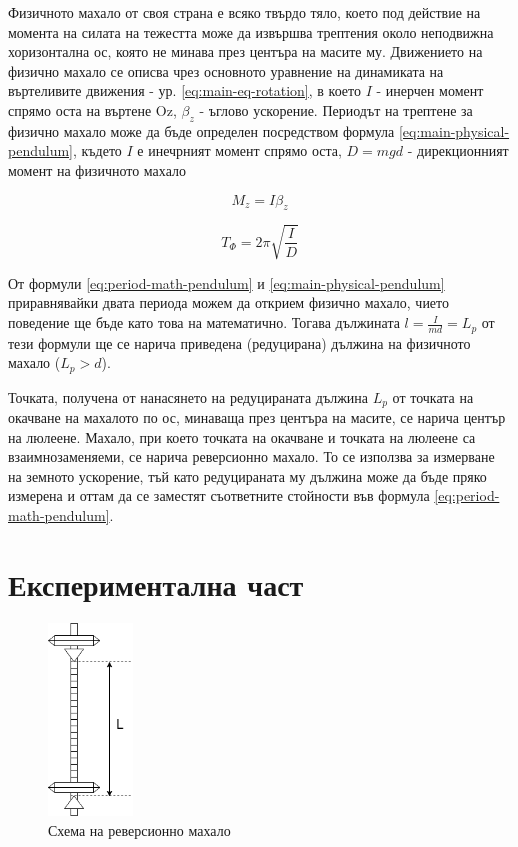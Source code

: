\documentclass[12pt]{article}
\begin{document}
Физичното махало от своя страна е всяко твърдо тяло, което под действие на момента на силата на тежестта може да извършва трептения около неподвижна хоризонтална ос, която не минава през центъра на масите му. Движението на физично махало се описва чрез основното уравнение на динамиката на въртеливите движения - ур. \ref{eq:main-eq-rotation}, в което $I$ - инерчен момент спрямо оста на въртене Oz, $\beta_z$ - ъглово ускорение. Периодът на трептене за физично махало може да бъде определен посредством формула \ref{eq:main-physical-pendulum}, където $I$ е инечрният момент спрямо оста, $D = mgd $ - дирекционният момент на физичното махало 

\begin{equation}\label{eq:main-eq-rotation}
    M_z = I\beta_z
\end{equation}

\begin{equation}\label{eq:main-physical-pendulum}
    T_\Phi = 2\pi \sqrt{\frac{I}{D}} 
\end{equation}

От формули \ref{eq:period-math-pendulum} и \ref{eq:main-physical-pendulum} приравнявайки двата периода можем да открием физично махало, чието поведение ще бъде като това на математично. Тогава дължината $l = \frac{I}{md} = L_p$ от тези формули ще се нарича приведена (редуцирана) дължина на физичното махало ($L_p > d$). 

Точката, получена от нанасянето на редуцираната дължина $L_p$ от точката на окачване на махалото по ос, минаваща през центъра на масите, се нарича център на люлеене. Махало, при което точката на окачване и точката на люлеене са взаимнозаменяеми, се нарича реверсионно махало. То се използва за измерване на земното ускорение, тъй като редуцираната му дължина може да бъде пряко измерена и оттам да се заместят съответните стойности във формула \ref{eq:period-math-pendulum}.


\section{Експериментална част}
\begin{figure}
    \centering
    \includegraphics[width=0.2\textwidth]{images/katers-pendulum.drawio.png}
    \caption{Схема на реверсионно махало}
    \label{fig:setup}
\end{figure}
\end{document}
